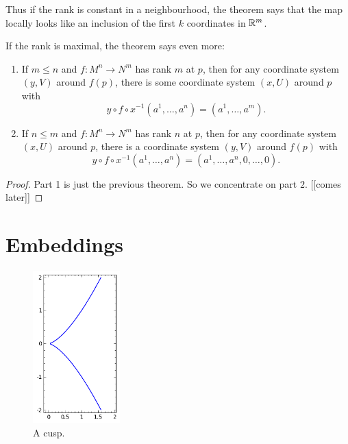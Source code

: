 \documentclass[11pt, english]{article}
\begin{document}
Thus if the rank is constant in a neighbourhood, the theorem says that the map locally looks like an inclusion of the first $k$ coordinates in $\mathbb{R}^m$.

If the rank is maximal, the theorem says even more:
\begin{thm}
\begin{enumerate}
\item If $m \leq n$ and $f:M^n \to N^m$ has rank $m$ at $p$, then for any coordinate system $(y,V)$ around $f(p)$, there is some coordinate system $(x,U)$ around $p$ with
\[
y \circ f \circ x^{-1}(a^1,\dotsc, a^n) = \left(a^1,\dotsc, a^m\right).
\]
\item If $n \leq m$ and $f:M^n \to N^m$ has rank $n$ at $p$, then for any coordinate system $(x,U)$ around $p$, there is a coordinate system $(y,V)$ around $f(p)$ with
\[
y \circ f \circ x^{-1}(a^1,\dotsc, a^n) = \left(a^1,\dotsc, a^n,0,\dotsc, 0 \right).
\]
\end{enumerate}
\end{thm}
\begin{proof}
Part 1 is just the previous theorem. So we concentrate on part $2$. [[comes later]]
\end{proof}

\newpage
\section{Embeddings}
\begin{figure}
 \vspace{-20pt}
  \begin{center}
    \includegraphics[width=0.3\textwidth]{cusp}
  \end{center}
 \vspace{-20pt}
  \label{cusp}

  \caption{A cusp.}
\end{figure}
\end{document}

